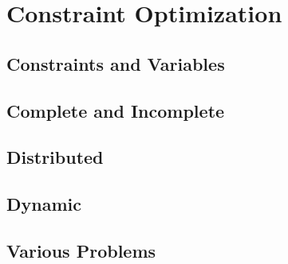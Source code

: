 \chapter{Constraint Optimization}
\section{Constraints and Variables}
\section{Complete and Incomplete}
\section{Distributed}
\section{Dynamic}
\section{Various Problems}
